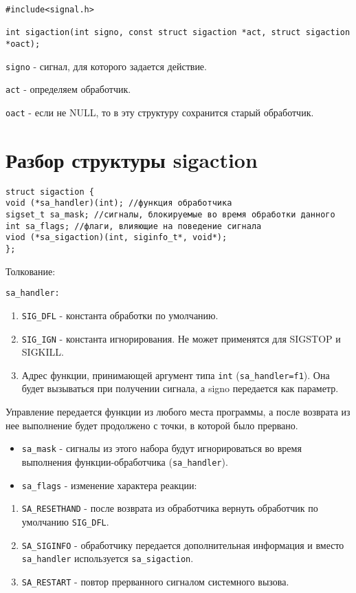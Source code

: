 \begin{verbatim}
#include<signal.h>

int sigaction(int signo, const struct sigaction *act, struct sigaction
*oact);
\end{verbatim}

\verb+signo+ - сигнал, для которого задается действие.

\verb+act+ - определяем обработчик.

\verb+oact+ - если не NULL, то в эту структуру сохранится старый обработчик.

\section{Разбор структуры sigaction}

\begin{verbatim}
struct sigaction {
void (*sa_handler)(int); //функция обработчика
sigset_t sa_mask; //сигналы, блокируемые во время обработки данного
int sa_flags; //флаги, влияющие на поведение сигнала
viod (*sa_sigaction)(int, siginfo_t*, void*);
};
\end{verbatim}

Толкование:

\verb+sa_handler:+
\begin{enumerate}
\item \verb+SIG_DFL+ - константа обработки по умолчанию.
\item \verb+SIG_IGN+ - константа игнорирования. Не может применятся для SIGSTOP и SIGKILL.
\item Адрес функции, принимающей аргумент типа \verb+int+ (\verb+sa_handler=f1+). Она будет вызываться при получении сигнала, а signo передается как параметр.
\end{enumerate}

Управление передается функции из любого места программы, а после возврата из нее выполнение будет продолжено с точки, в которой было прервано.
\begin{itemize}
\item \verb+sa_mask+ - сигналы из этого набора будут игнорироваться во время выполнения функции-обработчика (\verb+sa_handler+).
\item \verb+sa_flags+ - изменение характера реакции:
\end{itemize}

\begin{enumerate}
\item \verb+SA_RESETHAND+ - после возврата из обработчика вернуть обработчик по умолчанию \verb+SIG_DFL+.
\item \verb+SA_SIGINFO+ - обработчику передается дополнительная информация и вместо \verb+sa_handler+ используется \verb+sa_sigaction+.
\item \verb+SA_RESTART+ - повтор прерванного сигналом системного вызова.
\end{enumerate}


